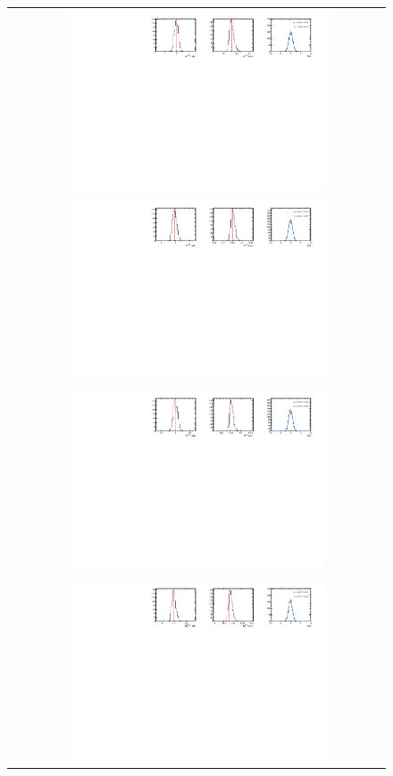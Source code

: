 \begin{figure}
  \centering
  \begin{tabular}{c}
\includegraphics[width=0.7\textwidth]{ANA_resources/Plots/Data_fit/FitterBias//A_signal_KK_run1.pdf} \\
\includegraphics[width=0.7\textwidth]{ANA_resources/Plots/Data_fit/FitterBias//R_signal_KK_run1.pdf} \\
\includegraphics[width=0.7\textwidth]{ANA_resources/Plots/Data_fit/FitterBias//A_Bs_KK_run1.pdf} \\
\includegraphics[width=0.7\textwidth]{ANA_resources/Plots/Data_fit/FitterBias//R_ds_KK_run1.pdf} \\

\end{tabular}
\end{figure}
